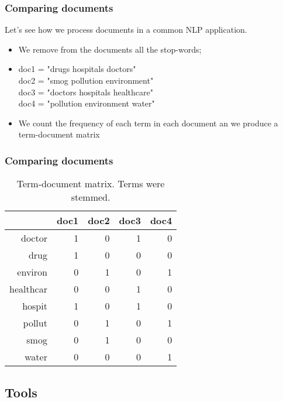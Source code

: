 \documentclass[serif, aspectratio=169]{beamer}
\begin{document}
\begin{frame}
\frametitle{Comparing documents}

Let's see how we process documents in a common NLP application.

\begin{itemize}

\item<1-> We remove from the documents all the stop-words;

\item<2-> doc1 = "drugs hospitals doctors" \\
doc2 = "smog pollution environment" \\
doc3 = "doctors hospitals healthcare" \\
doc4 = "pollution environment water" \\

\item<3-> We count the frequency of each term in each document an we produce a term-document matrix

\end{itemize}

\end{frame}

\begin{frame}
\frametitle{Comparing documents}

\begin{table}[ht]
\centering
\begin{tabular}{rrrrr}
  \hline
 & doc1 & doc2 & doc3 & doc4 \\ 
  \hline
doctor & 1 & 0 & 1 & 0 \\ 
  drug & 1 & 0 & 0 & 0 \\ 
  environ & 0 & 1 & 0 & 1 \\ 
  healthcar & 0 & 0 & 1 & 0 \\ 
  hospit & 1 & 0 & 1 & 0 \\ 
  pollut & 0 & 1 & 0 & 1 \\ 
  smog & 0 & 1 & 0 & 0 \\ 
  water & 0 & 0 & 0 & 1 \\ 
   \hline
\end{tabular}
\caption{Term-document matrix. Terms were stemmed.} 
\label{tab:example1-tf-table}
\end{table}

\end{frame}

\subsection{Tools}
\end{document}
